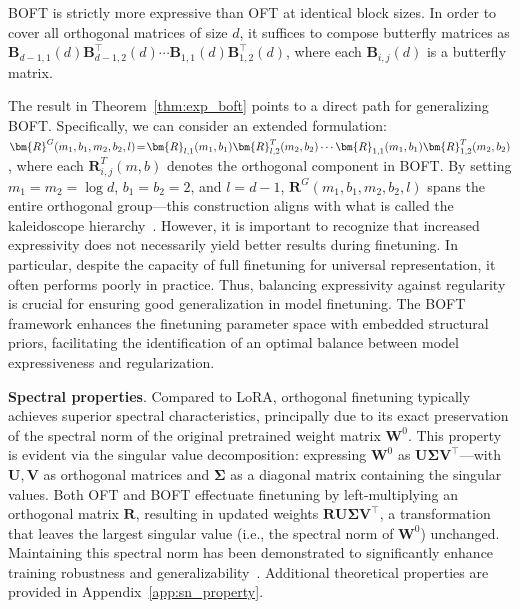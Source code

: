 \begin{theorem}\label{thm:exp_boft}
    BOFT is strictly more expressive than OFT at identical block sizes. In order to cover all orthogonal matrices of size $d$, it suffices to compose butterfly matrices as $\bm{B}_{d-1,1}(d)\bm{B}^\top_{d-1,2}(d)\cdots\bm{B}_{1,1}(d)\bm{B}^\top_{1,2}(d)$, where each $\bm{B}_{i,j}(d)$ is a butterfly matrix.
\end{theorem}

The result in Theorem~\ref{thm:exp_boft} points to a direct path for generalizing BOFT. Specifically, we can consider an extended formulation: $\thickmuskip=2mu \medmuskip=2mu \bm{R}^G(m_1,b_1,m_2,b_2,l)=\bm{R}_{l,1}(m_1,b_1)\bm{R}_{l,2}^T(m_2,b_2)\cdots\bm{R}_{1,1}(m_1,b_1)\bm{R}_{1,2}^T(m_2,b_2)$, where each $\bm{R}_{i,j}^T(m,b)$ denotes the orthogonal component in BOFT. By setting $m_1=m_2=\log d$, $b_1=b_2=2$, and $l=d-1$, $\bm{R}^G(m_1,b_1,m_2,b_2,l)$ spans the entire orthogonal group—this construction aligns with what is called the kaleidoscope hierarchy~\cite{dao2019kaleidoscope}. However, it is important to recognize that increased expressivity does not necessarily yield better results during finetuning. In particular, despite the capacity of full finetuning for universal representation, it often performs poorly in practice. Thus, balancing expressivity against regularity is crucial for ensuring good generalization in model finetuning. The BOFT framework enhances the finetuning parameter space with embedded structural priors, facilitating the identification of an optimal balance between model expressiveness and regularization.

\textbf{Spectral properties}. Compared to LoRA, orthogonal finetuning typically achieves superior spectral characteristics, principally due to its exact preservation of the spectral norm of the original pretrained weight matrix $\bm{W}^0$. This property is evident via the singular value decomposition: expressing $\bm{W}^0$ as $\bm{U}\bm{\Sigma}\bm{V}^\top$—with $\bm{U}, \bm{V}$ as orthogonal matrices and $\bm{\Sigma}$ as a diagonal matrix containing the singular values. Both OFT and BOFT effectuate finetuning by left-multiplying an orthogonal matrix $\bm{R}$, resulting in updated weights $\bm{R}\bm{U}\bm{\Sigma}\bm{V}^\top$, a transformation that leaves the largest singular value (i.e., the spectral norm of $\bm{W}^0$) unchanged. Maintaining this spectral norm has been demonstrated to significantly enhance training robustness and generalizability~\cite{miyato2018spectral,yoshida2017spectral}. Additional theoretical properties are provided in Appendix~\ref{app:sn_property}.

